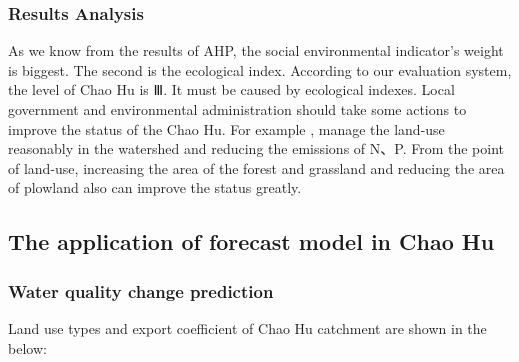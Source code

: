 \documentclass[12pt,a4paper]{article}
\begin{document}
\subsubsection{Results Analysis}
As we know from the results of AHP, the social environmental indicator's weight is biggest. The second is the ecological index. According to our evaluation system, the level of Chao Hu is Ⅲ. It must be caused by ecological indexes. Local government and environmental administration should take some actions to improve the status of the Chao Hu. For example , manage the land-use reasonably in the watershed and reducing the emissions of N、P. From the point of land-use, increasing the area of the forest and grassland and reducing the area of plowland also can improve the status greatly.\par

\subsection{The application of forecast model in Chao Hu}

\subsubsection{Water quality change prediction}
Land use types and export coefficient of Chao Hu catchment are shown in the below:
\end{document}
